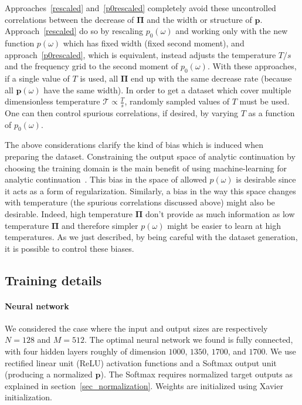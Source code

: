 \documentclass[notitlepage,11pt,nofootinbib]{revtex4-1}
\renewcommand{\vec}[1]{\bm{#1}}
\begin{document}
Approaches~\ref{rescaled} and~\ref{p0rescaled} completely avoid these uncontrolled correlations between the decrease of $\vec \Pi$ and the width or structure of $\vec p$. Approach~\ref{rescaled} do so by rescaling $p_0(\omega)$ and working only with the new function $p(\omega)$ which has fixed width (fixed second moment), and approach~\ref{p0rescaled}, which is equivalent, instead adjusts the temperature $T/s$ and the frequency grid to the second moment of $p_0(\omega)$.
With these approaches, if a single value of $T$ is used, all $\vec \Pi$ end up with the same decrease rate (because all $\vec p(\omega)$ have the same width). In order to get a dataset which cover multiple dimensionless temperature $\mathcal T\propto\frac{T}{s}$, randomly sampled values of $T$ must be used. One can then control spurious correlations, if desired, by varying $T$ as a function of $p_0(\omega)$.

The above considerations clarify the kind of bias which is induced when preparing the dataset. Constraining the output space of analytic continuation by choosing the training domain is the main benefit of using machine-learning for analytic continuation~\cite{Arsenault2017}. This bias in the space of allowed $p(\omega)$ is desirable since it acts as a form of regularization. Similarly, a bias in the way this space changes with temperature (the spurious correlations discussed above) might also be desirable. Indeed, high temperature $\vec \Pi$ don't provide as much information as low temperature $\vec \Pi$ and therefore simpler $p(\omega)$ might be easier to learn at high temperatures. As we just described, by being careful with the dataset generation, it is possible to control these biases.

\subsection{Training details}
\label{sec_training}

\paragraph*{Neural network} We considered the case where the input and output sizes are respectively $N=128$ and $M=512$. The optimal neural network we found is fully connected, with four hidden layers roughly of dimension $1000$, $1350$, $1700$, and $1700$. We use rectified linear unit (ReLU) activation functions and a Softmax output unit (producing a normalized $\vec p$). The Softmax requires normalized target outputs as explained in section~\ref{sec_normalization}. Weights are initialized using Xavier initialization.
\end{document}
